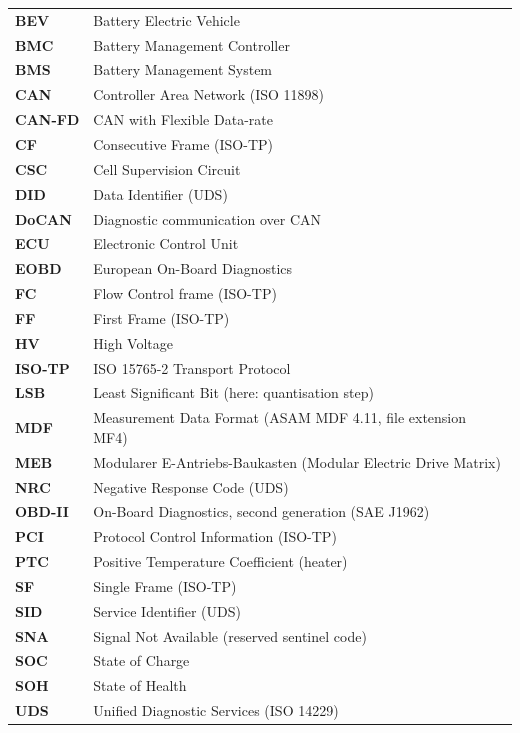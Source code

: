 \documentclass[11pt,a4paper,oneside,parskip=half]{scrreprt}
\begin{document}
\begin{tabular}{@{}lp{10.5cm}@{}}
\textbf{BEV}   & Battery Electric Vehicle \\
\textbf{BMC}   & Battery Management Controller \\
\textbf{BMS}   & Battery Management System \\
\textbf{CAN}   & Controller Area Network (ISO 11898) \\
\textbf{CAN-FD}& CAN with Flexible Data-rate \\
\textbf{CF}    & Consecutive Frame (ISO-TP) \\
\textbf{CSC}   & Cell Supervision Circuit \\
\textbf{DID}   & Data Identifier (UDS) \\
\textbf{DoCAN} & Diagnostic communication over CAN \\
\textbf{ECU}   & Electronic Control Unit \\
\textbf{EOBD}  & European On-Board Diagnostics \\
\textbf{FC}    & Flow Control frame (ISO-TP) \\
\textbf{FF}    & First Frame (ISO-TP) \\
\textbf{HV}    & High Voltage \\
\textbf{ISO-TP}& ISO 15765-2 Transport Protocol \\
\textbf{LSB}   & Least Significant Bit (here: quantisation step) \\
\textbf{MDF}   & Measurement Data Format (ASAM MDF 4.11, file extension MF4) \\
\textbf{MEB}   & Modularer E-Antriebs-Baukasten (Modular Electric Drive Matrix) \\
\textbf{NRC}   & Negative Response Code (UDS) \\
\textbf{OBD-II}& On-Board Diagnostics, second generation (SAE J1962) \\
\textbf{PCI}   & Protocol Control Information (ISO-TP) \\
\textbf{PTC}   & Positive Temperature Coefficient (heater) \\
\textbf{SF}    & Single Frame (ISO-TP) \\
\textbf{SID}   & Service Identifier (UDS) \\
\textbf{SNA}   & Signal Not Available (reserved sentinel code) \\
\textbf{SOC}   & State of Charge \\
\textbf{SOH}   & State of Health \\
\textbf{UDS}   & Unified Diagnostic Services (ISO 14229) \\
\end{tabular}
\end{document}
